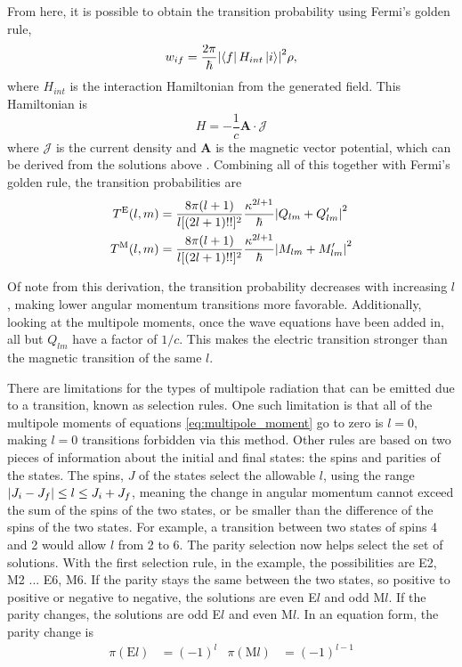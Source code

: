 From here, it is possible to obtain the transition probability using Fermi's golden rule,
\begin{equation}
    \label{eq:golden}
    w_{if}=\frac{2\pi}{\hbar}\abs{\bra{f}H_{int}\ket{i}}^2\rho,
\end{equation}
where $H_{int}$ is the interaction Hamiltonian from the generated field. This Hamiltonian is
\begin{equation}
    H = -\frac{1}{c}\boldsymbol{A}\cdot\mathcal{J}
\end{equation}
where $\mathcal{J}$ is the current density and $\boldsymbol{A}$ is the magnetic vector potential, which can be derived from the solutions above \citep{wong90:_nuclear}. Combining all of this together with Fermi's golden rule, the transition probabilities are
\begin{subequations}
\begin{align}
    T^\text{E}(l,m) & = \frac{8\pi(l+1)}{l[(2l+1)!!]^2}\frac{\kappa^{2l+1}}{\hbar}\abs{Q_{lm}+Q'_{lm}}^2 \\
    T^\text{M}(l,m) & = \frac{8\pi(l+1)}{l[(2l+1)!!]^2}\frac{\kappa^{2l+1}}{\hbar}\abs{M_{lm}+M'_{lm}}^2
\end{align}
\end{subequations}

Of note from this derivation, the transition probability decreases with increasing $l$, making lower angular momentum transitions more favorable. Additionally, looking at the multipole moments, once the wave equations have been added in, all but $Q_{lm}$ have a factor of $1/c$. This makes the electric transition stronger than the magnetic transition of the same $l$.

There are limitations for the types of multipole radiation that can be emitted due to a transition, known as selection rules. One such limitation is that all of the multipole moments of equations \ref{eq:multipole_moment} go to zero is $l=0$, making $l=0$ transitions forbidden via this method. Other rules are based on two pieces of information about the initial and final states: the spins and parities of the states. The spins, $J$ of the states select the allowable $l$, using the range $\abs{J_i-J_f}\leq l\leq J_i+J_f$, meaning the change in angular momentum cannot exceed the sum of the spins of the two states, or be smaller than the difference of the spins of the two states. For example, a transition between two states of spins 4 and 2 would allow $l$ from 2 to 6. The parity selection now helps select the set of solutions. With the first selection rule, in the example, the possibilities are E2, M2 ... E6, M6. If the parity stays the same between the two states, so positive to positive or negative to negative, the solutions are even E$l$ and odd M$l$. If the parity changes, the solutions are odd E$l$ and even M$l$. In an equation form, the parity change is
\begin{align}
    \pi(\text{E}l) &= (-1)^{l} & \pi(\text{M}l) &= (-1)^{l-1}
\end{align}


